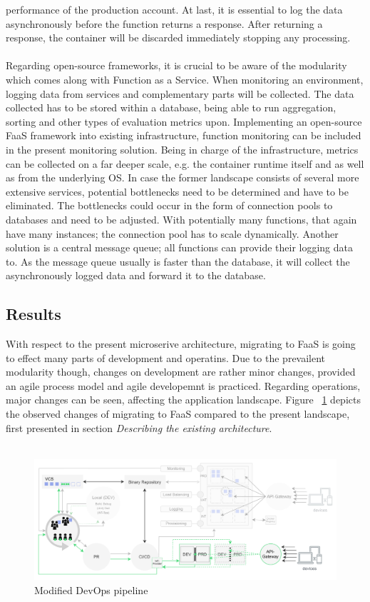 \documentclass[11pt]{article}
\begin{document}
performance of the production account. At last, it is essential to log the data asynchronously before the function returns a response. After returning a response, the container will be discarded immediately stopping any processing.\\\\ Regarding open-source frameworks, it is crucial to be aware of the modularity which comes along with Function as a Service. When monitoring an environment, logging data from services and complementary parts will be collected. The data collected has to be stored within a database, being able to run aggregation, sorting and other types of evaluation metrics upon. Implementing an open-source FaaS framework into existing infrastructure, function monitoring can be included in the present monitoring solution. Being in charge of the infrastructure, metrics can be collected on a far deeper scale, e.g. the container runtime itself and as well as from the underlying OS. In case the former landscape consists of several more extensive services, potential bottlenecks need to be determined and have to be eliminated. The bottlenecks could occur in the form of connection pools to databases and need to be adjusted. With potentially many functions, that again have many instances; the connection pool has to scale dynamically. Another solution is a central message queue; all functions can provide their logging data to. As the message queue usually is faster than the database, it will collect the asynchronously logged data and forward it to the database.
\subsection{Results}
With respect to the present microserive architecture, migrating to FaaS is going to effect many parts of development and operatins. Due to the prevailent modularity though, changes on development are rather minor changes, provided an agile process model and agile developemnt is practiced. Regarding operations, major changes can be seen, affecting the application landscape. Figure ~\ref{fig:devopsModified} depicts the observed changes of migrating to FaaS compared to the present landscape, first presented in section \textit{Describing the existing architecture}. \\\\ 
\begin{figure}[H]
  \caption{Modified DevOps pipeline}
  \label{fig:devopsModified}
  \centering
  \includegraphics[width=1\textwidth]{devopsModified}
\end{figure}
\newpage
\end{document}
